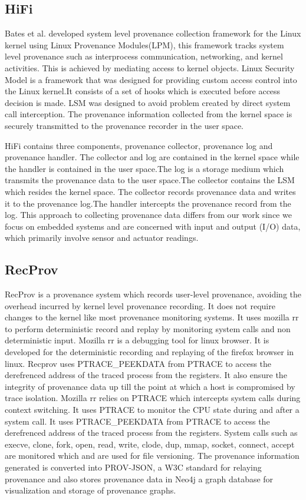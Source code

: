 \subsection{HiFi}
Bates et al. \cite{hi_fi}  developed system level provenance collection framework for the Linux kernel using Linux Provenance Modules(LPM), this framework tracks system level provenance such as interprocess communication, networking, and kernel activities. This is achieved by mediating access to kernel objects. Linux Security Model is a framework that was designed for providing custom access control into the Linux kernel.It consists of a set of hooks which is executed before access decision is made. LSM was designed to avoid problem created by direct system call interception. The provenance information collected from the kernel space is securely transmitted to the provenance recorder in the user space. 
\par HiFi contains three components, provenance collector, provenance log and provenance handler. The collector and log are contained in the kernel space while the handler is contained in the user space.The log is a storage medium which transmits the provenance data to the user space.The collector contains the LSM which resides the kernel space. The collector records provenance data and writes it to the provenance log.The handler intercepts the provenance record from the log. This approach to collecting provenance data differs from our work since we focus on embedded systems and are concerned with input and output (I/O) data, which primarily involve sensor and actuator readings.

\subsection{RecProv}

RecProv \cite{rec_prov} is a provenance system which records user-level provenance, avoiding the overhead incurred by kernel level provenance recording. It does not require changes to the kernel like most provenance monitoring systems. It uses mozilla rr to perform deterministic record and replay by monitoring system calls  and non deterministic input. Mozilla rr is a debugging tool for linux browser. It is developed for the deterministic recording and replaying of the firefox browser in linux. Recprov uses PTRACE\_PEEKDATA from PTRACE to access the derefrenced address of the traced process from the registers. It also ensure the integrity of provenance data up till the point at which a host is compromised by trace isolation. Mozilla rr relies on PTRACE which intercepts system calls during context switching. It uses PTRACE to monitor the CPU state during and after a system call. It uses PTRACE\_PEEKDATA from PTRACE to access the derefrenced address of the traced process from the registers. System calls such as execve, clone, fork, open, read, write, clode, dup, mmap, socket, connect, accept are monitored which and are used for file versioning. The provenance information generated is converted into PROV-JSON, a W3C standard for relaying provenance and also stores provenance data in Neo4j a graph database for visualization and storage of provenance graphs. 

